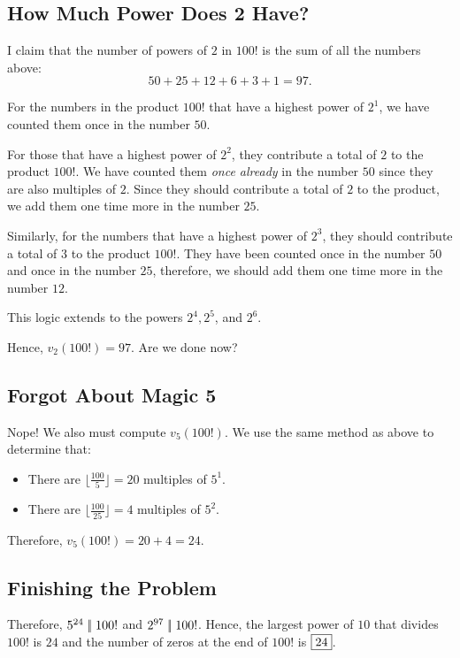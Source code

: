 \subsection*{How Much Power Does 2 Have?}

I claim that the number of powers of $2$ in $100!$ is the sum of all the numbers above: $$50+25+12+6+3+1=97.$$  

For the numbers in the product $100!$ that have a highest power of $2^{1}$, we have counted them once in the number $50$. 

For those that have a highest power of $2^{2}$, they contribute a total of $2$ to the product $100!$. We have counted them \textit{once already} in the number $50$ since they are also multiples of $2$. Since they should contribute a total of $2$ to the product, we add them one time more in the number $25$.  
\clearpage

Similarly, for the numbers that have a highest power of $2^3$, they should contribute a total of $3$ to the product $100!$. They have been counted once in the number $50$ and once in the number $25$, therefore, we should add them one time more in the number $12$.

This logic extends to the powers $2^4, 2^5$, and $2^6$.  

Hence, $v_2(100!)=97$.  Are we done now?

\clearpage

\subsection*{Forgot About Magic 5}

Nope! We also must compute $v_5(100!)$. We use the same method as above to determine that:
\begin{itemize}
	\item There are $\lfloor \frac{100}{5} \rfloor=20$ multiples of $5^1$.
	\item There are $\lfloor \frac{100}{25} \rfloor=4$ multiples of $5^2$.
\end{itemize} 

Therefore, $v_5(100!)=20+4=24$.  

\clearpage

\subsection*{Finishing the Problem}

Therefore, $5^{24}\mid\!\mid 100!$ and $2^{97}\mid\!\mid 100!$.  Hence, the largest power of $10$ that divides $100!$ is $24$ and the number of zeros at the end of $100!$ is $\framebox{24}$.   

